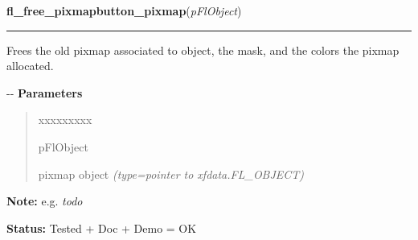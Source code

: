 \hspace{.8\funcindent}\begin{boxedminipage}{\funcwidth}

    \raggedright \textbf{fl\_free\_pixmapbutton\_pixmap}(\textit{pFlObject})

    \vspace{-1.5ex}

    \rule{\textwidth}{0.5\fboxrule}
\setlength{\parskip}{2ex}

Frees the old pixmap associated to object, the mask, and the colors the
pixmap allocated.

-{}-
\setlength{\parskip}{1ex}
      \textbf{Parameters}
      \vspace{-1ex}

      \begin{quote}
        \begin{Ventry}{xxxxxxxxx}

          \item[pFlObject]


pixmap object
            {\it (type=pointer to xfdata.FL\_OBJECT)}

        \end{Ventry}

      \end{quote}

\textbf{Note:} 
e.g. \emph{todo}


\textbf{Status:} 
Tested + Doc + Demo = OK


    \end{boxedminipage}

    \label{xformslib:flbitmap:fl_get_pixmap_pixmap}

    \vspace{0.5ex}

